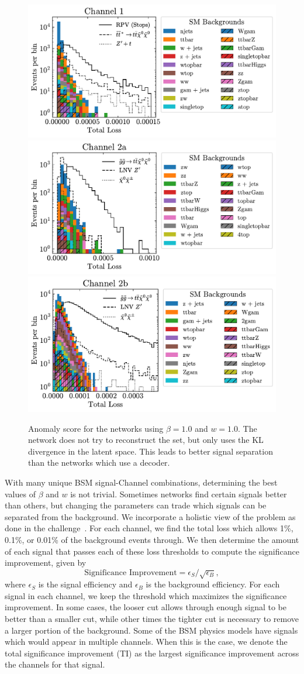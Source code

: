 \documentclass[submission, Phys]{SciPost}
\begin{document}
\begin{figure}[t]
    \begin{center}
    \includegraphics[width=0.45\linewidth]{figures/Channel1_losshist_1p0_1p0.pdf}
    \includegraphics[width=0.45\linewidth]{figures/Channel2a_losshist_1p0_1p0.pdf}
    \includegraphics[width=0.45\linewidth]{figures/Channel2b_losshist_1p0_1p0.pdf}
    \caption{Anomaly score for the networks using $\beta=1.0$ and $w=1.0$.
        The network does not try to reconstruct the set, but only uses the KL divergence in the latent space.
        This leads to better signal separation than the networks which use a decoder.
        }
    \label{fig:loss_hist_1p0}
\end{center}
\end{figure}

With many unique BSM signal-Channel combinations, determining the best values of $\beta$ and $w$ is not trivial.
Sometimes networks find certain signals better than others, but changing the parameters can trade which signals can be separated from the background.
We incorporate a holistic view of the problem as done in the challenge~\cite{Aarrestad:2021oeb, bryan_ostdiek_2021_4897467}.
For each channel, we find the total loss which allows 1\%, 0.1\%, or 0.01\% of the background events through.
We then determine the amount of each signal that passes each of these loss thresholds to compute the significance improvement, given by
\begin{equation}
    \text{Significance Improvement} = \epsilon_S / \sqrt{\epsilon_B},
\end{equation}
where $\epsilon_S$ is the signal efficiency and $\epsilon_B$ is the background efficiency.
For each signal in each channel, we keep the threshold which maximizes the significance improvement.
In some cases, the looser cut allows through enough signal to be better than a smaller cut, while other times the tighter cut is necessary to remove a larger portion of the background.
Some of the BSM physics models have signals which would appear in multiple channels.
When this is the case, we denote the total significance improvement (TI) as the largest significance improvement across the channels for that signal.
\end{document}
